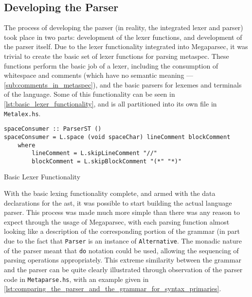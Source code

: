 
\subsection{Developing the Parser} %
\label{sub:developing_the_parser}

The process of developing the parser (in reality, the integrated lexer and parser) took place in two parts: development of the lexer functions, and development of the parser itself. 
Due to the lexer functionality integrated into Megaparsec, it was trivial to create the basic set of lexer functions for parsing \gls{metaspec}. 
These functions perform the basic job of a lexer, including the consumption of whitespace and comments (which have no semantic meaning --- \autoref{sub:comments_in_metaspec}), and the basic parsers for lexemes and terminals of the language.
Some of this functionality can be seen in \autoref{lst:basic_lexer_functionality}, and is all partitioned into its own file in \texttt{Metalex.hs}.

\begin{listing}[!htb]
\begin{verbatim}
spaceConsumer :: ParserST ()
spaceConsumer = L.space (void spaceChar) lineComment blockComment
    where
        lineComment = L.skipLineComment "//"
        blockComment = L.skipBlockComment "(*" "*)"
\end{verbatim}
\caption{Basic Lexer Functionality}
\label{lst:basic_lexer_functionality}
\end{listing}

With the basic lexing functionality complete, and armed with the data declarations for the \gls{ast}, it was possible to start building the actual language parser. 
This process was made much more simple than there was any reason to expect through the usage of Megaparsec, with each parsing function almost looking like a description of the corresponding portion of the grammar (in part due to the fact that \texttt{Parser} is an instance of \texttt{Alternative}. 
The monadic nature of the parser meant that \texttt{do} notation could be used, allowing the sequencing of parsing operations appropriately. 
This extreme similarity between the grammar and the parser can be quite clearly illustrated through observation of the parser code in \texttt{Metaparse.hs}, with an example given in \autoref{lst:comparing_the_parser_and_the_grammar_for_syntax_primaries}.\\

